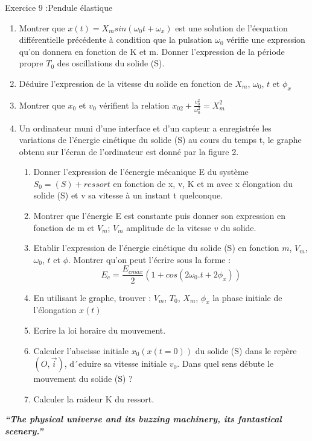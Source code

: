\documentclass[12pt, french]{article}
\begin{document}
\begin{Box2}{Exercice 9 :Pendule élastique}
\begin{enumerate}
\item Montrer que $x(t) = X_m sin (\omega_0t + \omega_x)$ est une solution de l’éequation différentielle précédente à condition
que la pulsation $\omega_0$ vérifie une expression qu’on donnera en fonction de K et m.
Donner l’expression de la période propre $T_0$ des oscillations du solide (S).
\item Déduire l’expression de la vitesse du solide en fonction de $X_m$, $\omega_0$, $t$ et $\phi_x$
\item Montrer que $x_0$ et $v_0$ vérifient la relation $x_{02} + \frac{v_0^2}{\omega_0^2} = X_m^2$
\item Un ordinateur muni d’une interface et d’un capteur a enregistrée les variations de l’énergie cinétique du solide
(S) au cours du temps t, le graphe obtenu sur l’écran de l’ordinateur est donné par la figure 2.
\begin{enumerate}
  \item Donner l’expression de l’éenergie mécanique E du système $S_0 = {(S)+ ressort }$ en fonction de x, v, K
et m avec x élongation du solide (S) et v sa vitesse à un instant t quelconque.
\item Montrer que l’énergie E est constante puis donner son expression en fonction de m et $V_m$; $V_m$ amplitude
de la vitesse $v$ du solide.
\item Etablir l’expression de l’énergie cinétique du solide (S) en fonction $m$, $V_m$, $\omega_0$, $t$ et $\phi$. Montrer qu’on
  peut l’écrire sous la forme : $$E_c  = \frac{E_{cmax}}{2}(1 + cos(2\omega_0.t + 2\phi_x))$$
\item  En utilisant le graphe, trouver : $V_m$, $T_0$, $X_m$, $\phi_x$ la phase initiale de l'élongation $x(t)$
\item Ecrire la loi horaire du mouvement.
\item Calculer l’abscisse initiale $x_0(x(t = 0))$ du solide (S) dans le repère $(O, \vec{i})$, d´eduire sa vitesse initiale $v_0$.
Dans quel sens débute le mouvement du solide (S) ?
\item Calculer la raideur K du ressort.
\end{enumerate}
\end{enumerate}


   \end{Box2}
\begin{center} \emph{\textbf{“The physical universe and its buzzing machinery, its fantastical scenery.”}}
\end{center}

\end{document}
